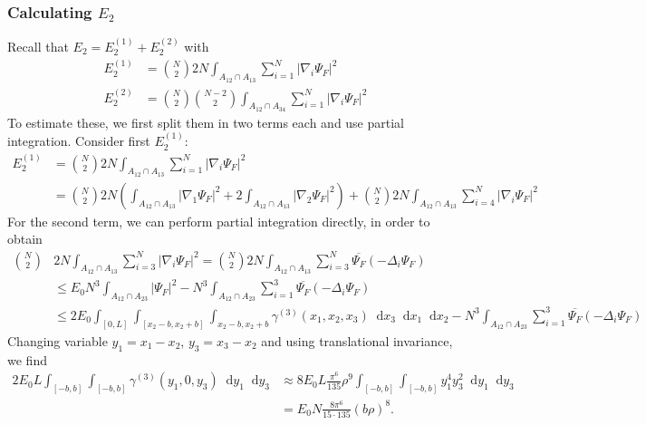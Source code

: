 \documentclass[a4paper,11pt]{article}
\newcommand{\abs}[1]{\left\lvert #1 \right\rvert}
\newcommand*\diff{\mathop{}\!\mathrm{d}}
\numberwithin{equation}{section}
\begin{document}
	\subsubsection{Calculating $ E_2 $}
	Recall that $ E_2=E_2^{(1)}+E_2^{(2)} $ with \begin{equation}
	\begin{aligned}
	E_2^{(1)}&=\binom{N}{2}2N\int_{A_{12}\cap A_{13}}\sum_{i=1}^{N}\abs{\nabla_i\Psi_F}^2\\ E_2^{(2)}&=\binom{N}{2}\binom{N-2}{2}\int_{A_{12}\cap A_{34}}\sum_{i=1}^{N}\abs{\nabla_i\Psi_F}^2
	\end{aligned}
	\end{equation}
	To estimate these, we first split them in two terms each and use partial integration. Consider first $ E_2^{(1)} $: 
	\begin{equation}
	\begin{aligned}
	E_2^{(1)}&=\binom{N}{2}2N\int_{A_{12}\cap A_{13}}\sum_{i=1}^{N}\abs{\nabla_i\Psi_F}^2\\
	&=\binom{N}{2}2N\left(\int_{A_{12}\cap A_{13}}\abs{\nabla_1\Psi_F}^2+2\int_{A_{12}\cap A_{13}}\abs{\nabla_2\Psi_F}^2\right)+\binom{N}{2}2N\int_{A_{12}\cap A_{13}}\sum_{i=4}^{N}\abs{\nabla_i\Psi_F}^2
	\end{aligned}
	\end{equation}
	For the second term, we can perform partial integration directly, in order to obtain \begin{equation}
	\begin{aligned}
		\binom{N}{2}&2N\int_{A_{12}\cap A_{13}}\sum_{i=3}^{N}\abs{\nabla_i\Psi_F}^2=\binom{N}{2}2N\int_{A_{12}\cap A_{13}}\sum_{i=3}^{N}\overline{\Psi_F}(-\Delta_i\Psi_F)\\
		&\leq E_0 N^3\int_{A_{12}\cap A_{23}}\abs{\Psi_F}^2-N^3\int_{A_{12}\cap A_{23}}\sum_{i=1}^{3}\overline{\Psi_F}(-\Delta_i\Psi_F)\\&\leq 2E_0\int_{[0,L]}\int_{[x_2-b,x_2+b]}\int_{x_2-b,x_2+b}\gamma^{(3)}(x_1,x_2,x_3)\diff x_3\diff x_1\diff x_2-N^3\int_{A_{12}\cap A_{23}}\sum_{i=1}^{3}\overline{\Psi_F}(-\Delta_i\Psi_F)
	\end{aligned}
	\end{equation}
	Changing variable $ y_1=x_1-x_2 $, $ y_3=x_3-x_2 $ and using translational invariance, we find \begin{equation}
	\begin{aligned}
	2E_0 L \int_{[-b,b]}\int_{[-b,b]}\gamma^{(3)}(y_1,0,y_3)\diff y_1\diff y_3&\approx 8E_0 L\frac{\pi^6}{135}\rho^9  \int_{[-b,b]}\int_{[-b,b]}y_1^4y_3^2\diff y_1\diff y_3\\
	&=E_0 N\frac{8\pi^6}{15\cdot 135}(b\rho)^8.
	\end{aligned}
	\end{equation}
\end{document}
